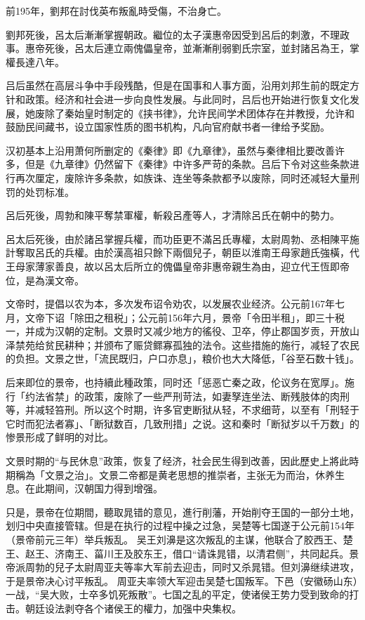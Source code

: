 前195年，劉邦在討伐英布叛亂時受傷，不治身亡。

劉邦死後，呂太后漸漸掌握朝政。繼位的太子漢惠帝因受到呂后的刺激，不理政事。惠帝死後，呂太后連立兩傀儡皇帝，並漸漸削弱劉氏宗室，並封諸呂為王，掌權長達八年。

吕后虽然在高层斗争中手段残酷，但是在国事和人事方面，沿用刘邦生前的既定方针和政策。经济和社会进一步向良性发展。与此同时，吕后也开始进行恢复文化发展，她废除了秦始皇时制定的《挟书律》，允许民间学术团体存在并教授，允许和鼓励民间藏书，设立国家性质的图书机构，凡向官府献书者一律给予奖励。

汉初基本上沿用萧何所删定的《秦律》即《九章律》，虽然与秦律相比要改善许多，但是《九章律》仍然留下《秦律》中许多严苛的条款。吕后下令对这些条款进行再次厘定，废除许多条款，如族诛、连坐等条款都予以废除，同时还减轻大量刑罚的处罚标准。

呂后死後，周勃和陳平奪禁軍權，斬殺呂產等人，才清除呂氏在朝中的勢力。

呂太后死後，由於諸呂掌握兵權，而功臣更不滿呂氏專權，太尉周勃、丞相陳平施計奪取呂氏的兵權。由於漢高祖只餘下兩個兒子，朝臣以淮南王母家趙氏強橫，代王母家薄家善良，故以呂太后所立的傀儡皇帝非惠帝親生為由，迎立代王恆即帝位，是為漢文帝。

文帝时，提倡以农为本，多次发布诏令劝农，以发展农业经济。公元前167年七月，文帝下诏「除田之租税」；公元前156年六月，景帝「令田半租」，即三十税一，并成为汉朝的定制。文景时又减少地方的徭役、卫卒，停止郡国岁贡，开放山泽禁苑给贫民耕种；并颁布了赈贷鳏寡孤独的法令。这些措施的施行，减轻了农民的负担。文景之世，「流民既归，户口亦息」，粮价也大大降低，「谷至石数十钱」。

后来即位的景帝，也持續此種政策，同时还「惩恶亡秦之政，伦议务在宽厚」。施行「约法省禁」的政策，废除了一些严刑苛法，如妻孥连坐法、断残肢体的肉刑等，并减轻笞刑。所以这个时期，许多官吏断狱从轻，不求细苛，以至有「刑轻于它时而犯法者寡」、「断狱数百，几致刑措」之说。这和秦时「断狱岁以千万数」的惨景形成了鲜明的对比。

文景时期的“与民休息”政策，恢复了经济，社会民生得到改善，因此歷史上將此時期稱為「文景之治」。文景二帝都是黄老思想的推崇者，主张无为而治，休养生息。在此期间，汉朝国力得到增强。

只是，景帝在位期間，聽取晁错的意见，進行削藩，开始削夺王国的一部分土地，划归中央直接管辖。但是在执行的过程中操之过急，吴楚等七国遂于公元前154年（景帝前元三年）举兵叛乱。 吴王刘濞是这次叛乱的主谋，他联合了胶西王、楚王、赵王、济南王、菑川王及胶东王，借口“请诛晁错，以清君侧”，共同起兵。景帝派周勃的兒子太尉周亚夫等率大军前去迎击，同时又杀晁错。但刘濞继续进攻，于是景帝决心讨平叛乱。 周亚夫率领大军迎击吴楚七国叛军。下邑（安徽砀山东）一战，“吴大败，士卒多饥死叛散”。七国之乱的平定，使诸侯王势力受到致命的打击。朝廷设法剥夺各个诸侯王的權力，加强中央集权。

